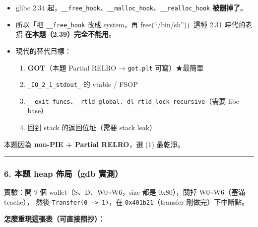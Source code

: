 \documentclass[10pt,a4paper]{article}
\providecommand{\tightlist}{%
  \setlength{\itemsep}{0pt}\setlength{\parskip}{0pt}}
\begin{document}
\begin{itemize}
\tightlist
\item
  glibc 2.34
  起，\texttt{\_\allowbreak{}\_\allowbreak{}free\_\allowbreak{}hook}、\texttt{\_\allowbreak{}\_\allowbreak{}malloc\_\allowbreak{}hook}、\texttt{\_\allowbreak{}\_\allowbreak{}realloc\_\allowbreak{}hook}
  \textbf{被刪掉了}。
\item
  所以「把 \texttt{\_\allowbreak{}\_\allowbreak{}free\_\allowbreak{}hook} 改成 system，再
  free(``/bin/sh'')」這種 2.31 時代的老招
  \textbf{在本題（2.39）完全不能用}。
\item
  現代的替代目標：

  \begin{enumerate}
  \def\labelenumi{\arabic{enumi}.}
  \tightlist
  \item
    \textbf{GOT}（本題 Partial RELRO → \texttt{got.\allowbreak{}plt} 可寫）★最簡單
  \item
    \texttt{\_\allowbreak{}IO\_\allowbreak{}2\_\allowbreak{}1\_\allowbreak{}stdout\_\allowbreak{}} 的 vtable / FSOP
  \item
    \texttt{\_\allowbreak{}\_\allowbreak{}exit\_\allowbreak{}funcs}、\texttt{\_\allowbreak{}rtld\_\allowbreak{}global.\allowbreak{}\_\allowbreak{}dl\_\allowbreak{}rtld\_\allowbreak{}lock\_\allowbreak{}recursive}（需要
    libc base）
  \item
    回到 stack 的返回位址（需要 stack leak）
  \end{enumerate}
\end{itemize}

本題因為 \textbf{non-PIE + Partial RELRO}，選 (1) 最乾淨。

\begin{center}\rule{0.5\linewidth}{0.5pt}\end{center}

\subsubsection{6. 本題 heap 佈局（gdb
實測）}\label{ux672cux984c-heap-ux4f48ux5c40gdb-ux5be6ux6e2c}

實驗：開 9 個 wallet（S、D、W0\textasciitilde W6，size 都是 0x80），關掉
W0\textasciitilde W6（塞滿 tcache）， 然後
\texttt{Transfer(0\ \allowbreak{}-\allowbreak{}\textgreater{}\allowbreak{}\ \allowbreak{}1)}，在 \texttt{0x401b21}（transfer
剛做完）下中斷點。

\textbf{怎麼重現這張表（可直接照抄）：}
\end{document}
